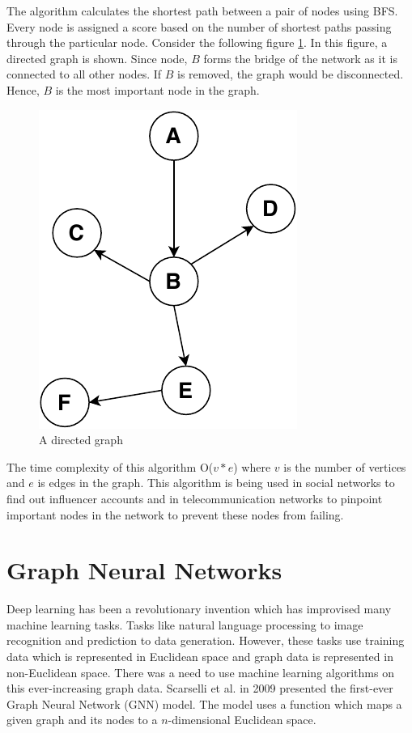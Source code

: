 \documentclass[journal,twoside,web]{ieeecolor}
\begin{document}
The algorithm calculates the shortest path between a pair of nodes using BFS. Every node is assigned a score based on the number of shortest paths passing through the particular node. Consider the following figure \ref{fig15}. In this figure, a directed graph is shown. Since node, $B$ forms the bridge of the network as it is connected to all other nodes. If $B$ is removed, the graph would be disconnected. Hence, $B$ is the most important node in the graph.

\begin{figure}[!h]
    \centerline{\includegraphics[scale=0.8]{figures/betweeness.pdf}}
    \caption{A directed graph}
    \label{fig15}
\end{figure}

The time complexity of this algorithm O($v*e$) where $v$ is the number of vertices and $e$ is edges in the graph. This algorithm is being used in social networks to find out influencer accounts and in telecommunication networks to pinpoint important nodes in the network to prevent these nodes from failing.

\section{Graph Neural Networks}
\label{sec:gnn}
Deep learning has been a revolutionary invention which has improvised many machine learning tasks. Tasks like natural language processing to image recognition and prediction to data generation. However, these tasks use training data which is represented in Euclidean space and graph data is represented in non-Euclidean space. There was a need to use machine learning algorithms on this ever-increasing graph data. Scarselli et al. in 2009 presented the first-ever Graph Neural Network (GNN) model\cite{34}. The model uses a function which maps a given graph and its nodes to a $n$-dimensional Euclidean space. 
\end{document}
